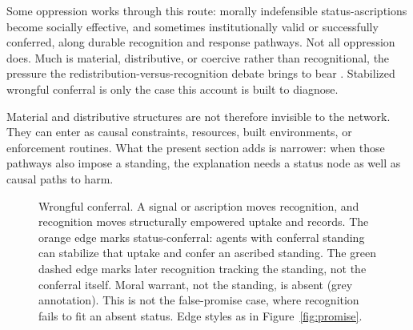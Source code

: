 \documentclass[12pt]{article}
\begin{document}
Some oppression works through this route: morally indefensible status-ascriptions become socially effective, and sometimes institutionally valid or successfully conferred, along durable recognition and response pathways. Not all oppression does. Much is material, distributive, or coercive rather than recognitional, the pressure the redistribution-versus-recognition debate brings to bear \citep{fraserHonneth2003Redistribution}. Stabilized wrongful conferral is only the case this account is built to diagnose.

Material and distributive structures are not therefore invisible to the network. They can enter as causal constraints, resources, built environments, or enforcement routines. What the present section adds is narrower: when those pathways also impose a standing, the explanation needs a status node as well as causal paths to harm.

\begin{figure}[H]
  \centering
  \caption{Wrongful conferral. A signal or ascription moves recognition, and recognition moves structurally empowered uptake and records. The orange edge marks status-conferral: agents with conferral standing can stabilize that uptake and confer an ascribed standing. The green dashed edge marks later recognition tracking the standing, not the conferral itself. Moral warrant, not the standing, is absent (grey annotation). This is not the false-promise case, where recognition fails to fit an absent status. Edge styles as in Figure~\ref{fig:promise}.}
  \label{fig:misrecognition}
\end{figure}
\end{document}
